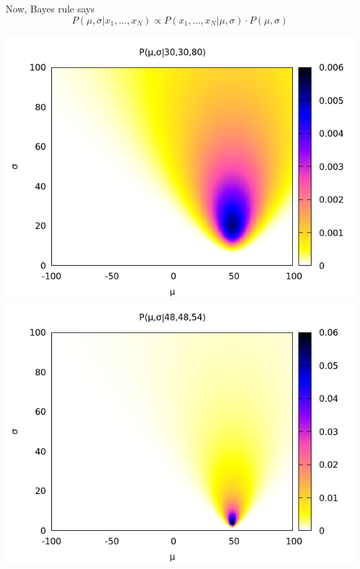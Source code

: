 Now, Bayes rule says
$$
P(\mu,\sigma|x_1,\ldots,x_N)\propto
P(x_1,\ldots,x_N|\mu,\sigma)\cdot P(\mu,\sigma)
$$

\includegraphics{bayes1.png}
\includegraphics{bayes2.png}
